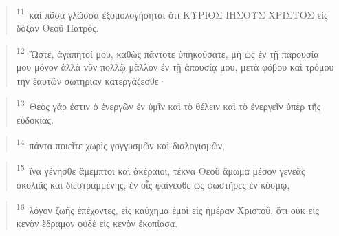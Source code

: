 \documentclass{article}
\newcommand{\currentverse}{1} %
\newcommand{\setcurrentverse}[1]{\renewcommand{\currentverse}{#1}}
\begin{document}
\begin{verse}

\setcurrentverse{11}

\setcounter{footnote}{0}

\textsuperscript{11}~καὶ πᾶσα γλῶσσα ἐξομολογήσηται ὅτι ΚΥΡΙΟΣ ΙΗΣΟΥΣ ΧΡΙΣΤΟΣ εἰς δόξαν Θεοῦ Πατρός.

\end{verse}

\begin{verse}

\setcurrentverse{12}

\setcounter{footnote}{0}

\textsuperscript{12}~Ὥστε, ἀγαπητοί μου, καθὼς πάντοτε ὑπηκούσατε, μὴ ὡς ἐν τῇ παρουσίᾳ μου μόνον ἀλλὰ νῦν πολλῷ μᾶλλον ἐν τῇ ἀπουσίᾳ μου, μετὰ φόβου καὶ τρόμου τὴν ἑαυτῶν σωτηρίαν κατεργάζεσθε·

\end{verse}

\begin{verse}

\setcurrentverse{13}

\setcounter{footnote}{0}

\textsuperscript{13}~Θεὸς γάρ ἐστιν ὁ ἐνεργῶν ἐν ὑμῖν καὶ τὸ θέλειν καὶ τὸ ἐνεργεῖν ὑπὲρ τῆς εὐδοκίας.

\end{verse}

\begin{verse}

\setcurrentverse{14}

\setcounter{footnote}{0}

\textsuperscript{14}~πάντα ποιεῖτε χωρὶς γογγυσμῶν καὶ διαλογισμῶν,

\end{verse}

\begin{verse}

\setcurrentverse{15}

\setcounter{footnote}{0}

\textsuperscript{15}~ἵνα γένησθε ἄμεμπτοι καὶ ἀκέραιοι, τέκνα Θεοῦ ἄμωμα μέσον γενεᾶς σκολιᾶς καὶ διεστραμμένης, ἐν οἷς φαίνεσθε ὡς φωστῆρες ἐν κόσμῳ,

\end{verse}

\begin{verse}

\setcurrentverse{16}

\setcounter{footnote}{0}

\textsuperscript{16}~λόγον ζωῆς ἐπέχοντες, εἰς καύχημα ἐμοὶ εἰς ἡμέραν Χριστοῦ, ὅτι οὐκ εἰς κενὸν ἔδραμον οὐδὲ εἰς κενὸν ἐκοπίασα.

\end{verse}
\end{document}
